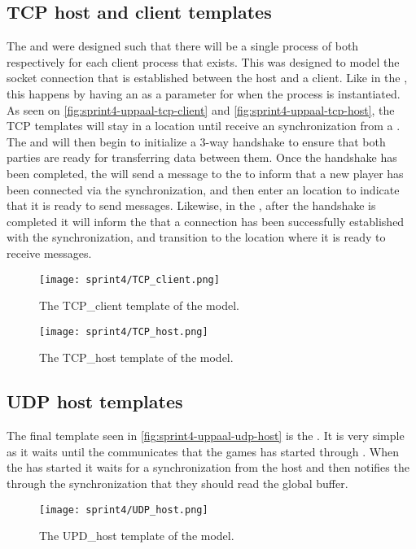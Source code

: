 \subsection{TCP host and client templates}
The  and  were designed such that there will be a single process of both respectively for each client process that exists.
This was designed to model the socket connection that is established between the host and a client.
Like in the , this happens by having an  as a parameter for when the process is instantiated.
As seen on \autoref{fig:sprint4-uppaal-tcp-client} and \autoref{fig:sprint4-uppaal-tcp-host}, the TCP templates will stay in a  location until  receive an  synchronization from a .
The  and  will then begin to initialize a 3-way handshake to ensure that both parties are ready for transferring data between them.
Once the handshake has been completed, the  will send a message to the  to inform that a new player has been connected via the  synchronization, and then enter an  location to indicate that it is ready to send messages.
Likewise, in the , after the handshake is completed it will inform the  that a connection has been successfully established with the  synchronization, and transition to the  location where it is ready to receive messages.

\begin{figure}[h]
    \centering
    \texttt{[image: sprint4/TCP\_client.png]}
    \caption{The TCP\_client template of the \uppaal model.}
    \label{fig:sprint4-uppaal-tcp-client}
\end{figure}

\begin{figure}[h]
    \centering
    \texttt{[image: sprint4/TCP\_host.png]}
    \caption{The TCP\_host template of the \uppaal model.}
    \label{fig:sprint4-uppaal-tcp-host}
\end{figure}

\subsection{UDP host templates}
The final template seen in \autoref{fig:sprint4-uppaal-udp-host} is the .
It is very simple as it waits until the  communicates that the games has started through .
When the  has started it waits for a  synchronization from the host and then notifies the  through the  synchronization that they should read the global buffer.
\begin{figure}[h]
    \centering
    \texttt{[image: sprint4/UDP\_host.png]}
    \caption{The UPD\_host template of the \uppaal model.}
    \label{fig:sprint4-uppaal-udp-host}
\end{figure}

